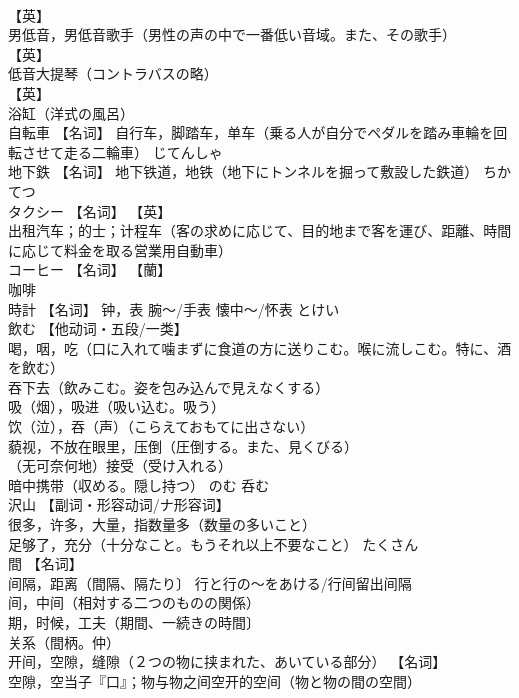 \documentclass[8pt]{extreport}
\begin{document}
\begin{CJK}{UTF8}{min}
\\	【英】
\\	男低音，男低音歌手（男性の声の中で一番低い音域。また、その歌手） 
\\	【英】
\\	低音大提琴（コントラバスの略） 
\\	【英】
\\	浴缸（洋式の風呂）		
\\	自転車	【名词】 自行车，脚踏车，单车（乗る人が自分でペダルを踏み車輪を回転させて走る二輪車）	じてんしゃ	
\\	地下鉄	【名词】 地下铁道，地铁（地下にトンネルを掘って敷設した鉄道）	ちかてつ	
\\	タクシー	【名词】 【英】
\\	出租汽车；的士；计程车（客の求めに応じて、目的地まで客を運び、距離、時間に応じて料金を取る営業用自動車）		
\\	コーヒー	【名词】 【蘭】
\\	咖啡		
\\	時計	【名词】 钟，表 腕〜/手表 懐中〜/怀表	とけい	
\\	飲む	【他动词・五段/一类】 
\\	喝，咽，吃（口に入れて噛まずに食道の方に送りこむ。喉に流しこむ。特に、酒を飲む） 
\\	吞下去（飲みこむ。姿を包み込んで見えなくする） 
\\	吸（烟），吸进（吸い込む。吸う） 
\\	饮（泣），吞（声）（こらえておもてに出さない） 
\\	藐视，不放在眼里，压倒（圧倒する。また、見くびる） 
\\	（无可奈何地）接受（受け入れる） 
\\	暗中携带（収める。隠し持つ）	のむ	呑む
\\	沢山	【副词・形容动词/ナ形容词】 
\\	很多，许多，大量，指数量多（数量の多いこと） 
\\	足够了，充分（十分なこと。もうそれ以上不要なこと）	たくさん	
\\	間	【名词】 
\\	间隔，距离（間隔、隔たり〕 行と行の～をあける/行间留出间隔 
\\	间，中间（相対する二つのものの関係） 
\\	期，时候，工夫（期間、一続きの時間〕 
\\	关系（間柄。仲） 
\\	开间，空隙，缝隙（２つの物に挟まれた、あいている部分） 【名词】 
\\	空隙，空当子『口』；物与物之间空开的空间（物と物の間の空間） 

\end{CJK}
\end{document}
